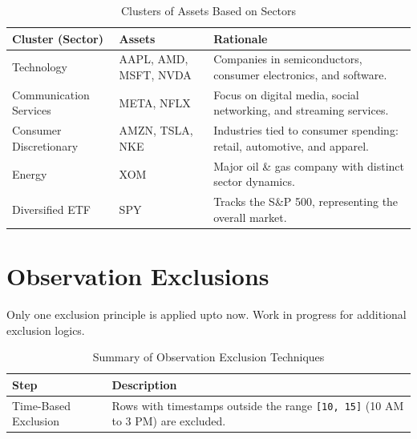 \documentclass[11pt]{article}
\begin{document}
\begin{table}[h!]
    \centering
    \begin{tabular}{|l|l|p{5cm}|} %
        \hline
        \textbf{Cluster (Sector)} & \textbf{Assets} & \textbf{Rationale} \\ \hline
        Technology & AAPL, AMD, MSFT, NVDA & Companies in semiconductors, consumer electronics, and software. \\ \hline
        Communication Services & META, NFLX & Focus on digital media, social networking, and streaming services. \\ \hline
        Consumer Discretionary & AMZN, TSLA, NKE & Industries tied to consumer spending: retail, automotive, and apparel. \\ \hline
        Energy & XOM & Major oil \& gas company with distinct sector dynamics. \\ \hline
        Diversified ETF & SPY & Tracks the S\&P 500, representing the overall market. \\ \hline
    \end{tabular}
    \caption{Clusters of Assets Based on Sectors}
    \label{tab:clusters}
\end{table}


\newpage

\section{Observation Exclusions}
Only one exclusion principle is applied upto now. Work in progress for additional exclusion logics.

\begin{table}[h!]
    \centering
    \caption{Summary of Observation Exclusion Techniques}
    \label{tab:observation_exclusion_technique}
    \begin{tabular}{|l|p{8cm}|}
        \hline
        \textbf{Step} & \textbf{Description} \\ \hline
        Time-Based Exclusion & Rows with timestamps outside the range \texttt{[10, 15]} (10 AM to 3 PM) are excluded. \\ \hline
    \end{tabular}
\end{table}
\end{document}
